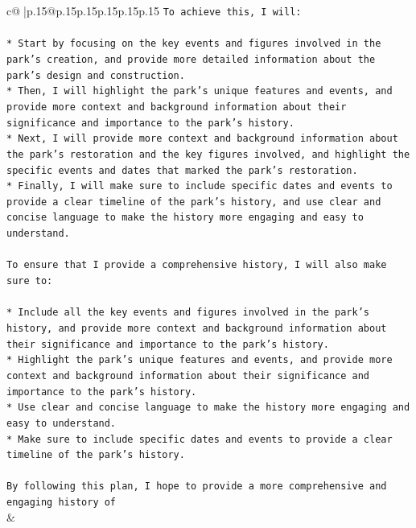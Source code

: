 \documentclass{article}
\begin{document}
{\begin{supertabular}{c@{$\;$}|p{.15\linewidth}@{}p{.15\linewidth}p{.15\linewidth}p{.15\linewidth}p{.15\linewidth}p{.15\linewidth}}
{{{\texttt{To achieve this, I will:} \\
\\ 
\texttt{* Start by focusing on the key events and figures involved in the park's creation, and provide more detailed information about the park's design and construction.} \\
\texttt{* Then, I will highlight the park's unique features and events, and provide more context and background information about their significance and importance to the park's history.} \\
\texttt{* Next, I will provide more context and background information about the park's restoration and the key figures involved, and highlight the specific events and dates that marked the park's restoration.} \\
\texttt{* Finally, I will make sure to include specific dates and events to provide a clear timeline of the park's history, and use clear and concise language to make the history more engaging and easy to understand.} \\
\\ 
\texttt{To ensure that I provide a comprehensive history, I will also make sure to:} \\
\\ 
\texttt{* Include all the key events and figures involved in the park's history, and provide more context and background information about their significance and importance to the park's history.} \\
\texttt{* Highlight the park's unique features and events, and provide more context and background information about their significance and importance to the park's history.} \\
\texttt{* Use clear and concise language to make the history more engaging and easy to understand.} \\
\texttt{* Make sure to include specific dates and events to provide a clear timeline of the park's history.} \\
\\ 
\texttt{By following this plan, I hope to provide a more comprehensive and engaging history of} \\
            }
        }
    }
    & \\ \\

\end{supertabular}
}
\end{document}
